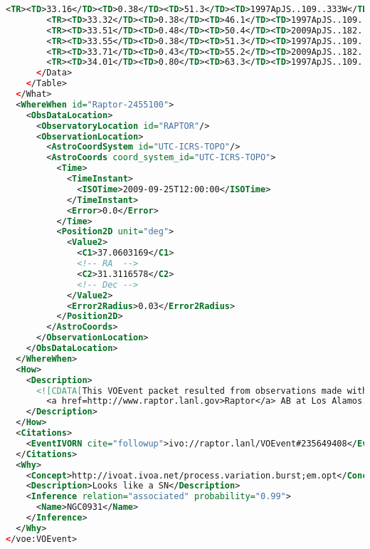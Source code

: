 \documentclass[11pt,a4paper]{ivoa}
\begin{document}
\begin{lstlisting}[language=XML]
        <TR><TD>33.16</TD><TD>0.38</TD><TD>51.3</TD><TD>1997ApJS..109..333W</TD></TR>
        <TR><TD>33.32</TD><TD>0.38</TD><TD>46.1</TD><TD>1997ApJS..109..333W</TD></TR>
        <TR><TD>33.51</TD><TD>0.48</TD><TD>50.4</TD><TD>2009ApJS..182..474S</TD></TR>
        <TR><TD>33.55</TD><TD>0.38</TD><TD>51.3</TD><TD>1997ApJS..109..333W</TD></TR>
        <TR><TD>33.71</TD><TD>0.43</TD><TD>55.2</TD><TD>2009ApJS..182..474S</TD></TR>
        <TR><TD>34.01</TD><TD>0.80</TD><TD>63.3</TD><TD>1997ApJS..109..333W</TD></TR>
      </Data>
    </Table>
  </What>
  <WhereWhen id="Raptor-2455100">
    <ObsDataLocation>
      <ObservatoryLocation id="RAPTOR"/>
      <ObservationLocation>
        <AstroCoordSystem id="UTC-ICRS-TOPO"/>
        <AstroCoords coord_system_id="UTC-ICRS-TOPO">
          <Time>
            <TimeInstant>
              <ISOTime>2009-09-25T12:00:00</ISOTime>
            </TimeInstant>
            <Error>0.0</Error>
          </Time>
          <Position2D unit="deg">
            <Value2>
              <C1>37.0603169</C1>
              <!-- RA  -->
              <C2>31.3116578</C2>
              <!-- Dec -->
            </Value2>
            <Error2Radius>0.03</Error2Radius>
          </Position2D>
        </AstroCoords>
      </ObservationLocation>
    </ObsDataLocation>
  </WhereWhen>
  <How>
    <Description>
      <![CDATA[This VOEvent packet resulted from observations made with
        <a href=http://www.raptor.lanl.gov>Raptor</a> AB at Los Alamos. ]]>
    </Description>
  </How>
  <Citations>
    <EventIVORN cite="followup">ivo://raptor.lanl/VOEvent#235649408</EventIVORN>
  </Citations>
  <Why>
    <Concept>http://ivoat.ivoa.net/process.variation.burst;em.opt</Concept>
    <Description>Looks like a SN</Description>
    <Inference relation="associated" probability="0.99">
      <Name>NGC0931</Name>
    </Inference>
  </Why>
</voe:VOEvent>
\end{lstlisting}
\end{document}
